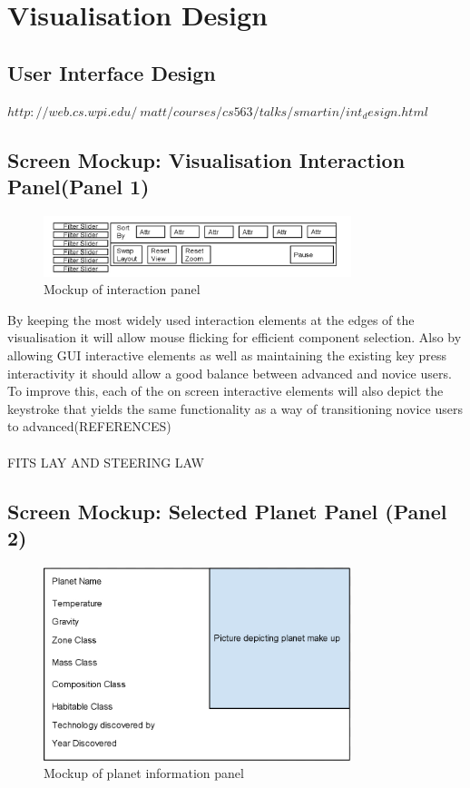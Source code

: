 \documentclass[11pt
              , a4paper
              , twoside
              , openright
              ]{report}
\begin{document}
\chapter{Visualisation Design}
\section{User Interface Design}
$http://web.cs.wpi.edu/~matt/courses/cs563/talks/smartin/int_design.html$
\section{Screen Mockup: Visualisation Interaction Panel(Panel 1)}

\begin{figure}[h!]
  \centering
      \includegraphics[width=0.8\textwidth]{images/interaction_mock.jpg}
  \caption{Mockup of interaction panel}
\end{figure}

By keeping the most widely used interaction elements at the edges of the visualisation it will allow mouse flicking for efficient component selection. Also by allowing GUI interactive elements as well as maintaining the existing key press interactivity it should allow a good balance between advanced and novice users. To improve this, each of the on screen interactive elements will also depict the keystroke that yields the same functionality as a way of transitioning novice users to advanced(REFERENCES)
\\\\
FITS LAY AND STEERING LAW
\section{Screen Mockup: Selected Planet Panel (Panel 2)}
\begin{figure}[H]
  \centering
      \includegraphics[width=0.8\textwidth]{images/planet_mock.jpg}
  \caption{Mockup of planet information panel}
\end{figure}
\end{document}
